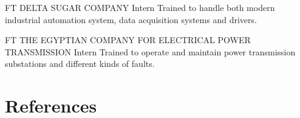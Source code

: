 \documentclass[10pt]{article} %
\begin{document}
\begin{paracol}{2}
{FT} %
{DELTA SUGAR COMPANY} %
{Intern} %
{Trained to handle both modern industrial automation system, data acquisition systems and drivers.}

{FT} %
{THE EGYPTIAN COMPANY FOR ELECTRICAL POWER TRANSMISSION} %
{Intern} %
{Trained to operate and maintain power transmission substations and different kinds of faults.}


\vspace{-\baselineskip}\medskip %


\section{References}







\begin{supertabular}{rl} %
	
%	
	

\end{supertabular}
\end{paracol}
\end{document}
